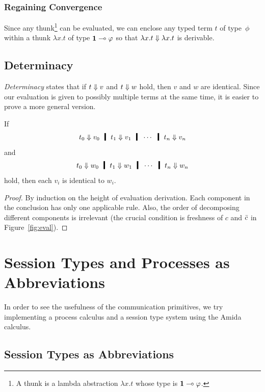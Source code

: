 \subsubsection{Regaining Convergence}

Since any thunk\footnote{A thunk is a lambda abstraction $\lambda x.t$
whose type is $\mathbf{1} \multimap \varphi$.} can be evaluated,
we can enclose any typed term $t$ of type~$\phi$ within a thunk $\lambda
x.t$ of type $\mathbf{1}\multimap\varphi$ so that $\lambda x.t\Downarrow \lambda x.t$ is derivable.

  \subsection{Determinacy}

  \textit{Determinacy}
  states that if $t\Downarrow v$ and $t\Downarrow w$ hold,
  then $v$ and $w$ are identical.
  Since our evaluation is given to possibly multiple terms at the same
  time, it is easier to prove a more general version.
  \begin{theorem}
   If
   \[
    t_0\eval v_0\hmid t_1\eval v_1\hmid \cdots \hmid t_n\eval v_n
   \]
   and
   \[
    t_0\eval w_0\hmid t_1\eval w_1\hmid \cdots \hmid t_n\eval w_n
   \]
   hold, then each $v_i$ is identical to $w_i$.
  \end{theorem}
  \begin{proof}
   By induction on the height of evaluation derivation.
   Each component in the conclusion has only one applicable rule.
   Also, the order of decomposing different components is irrelevant
   (the crucial
   condition is freshness of $c$ and $\bar{c}$ in Figure~\ref{fig:eval}).
  \end{proof}

  \section{Session Types and Processes as Abbreviations}
  \label{sec:session-process}

    In order to see the usefulness of the communication primitives,
    we try implementing a process calculus and a session type system
    using the Amida calculus.

    \subsection{Session Types as Abbreviations}

